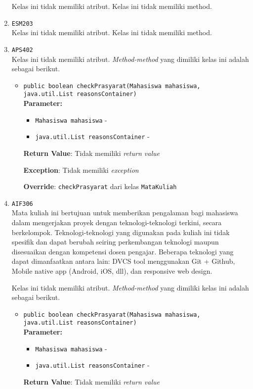 \documentclass{article}
\begin{document}
\begin{enumerate}
Kelas ini tidak memiliki atribut. Kelas ini tidak memiliki method. \item \texttt{ESM203}\\ 


Kelas ini tidak memiliki atribut. Kelas ini tidak memiliki method. \item \texttt{APS402}\\ 


Kelas ini tidak memiliki atribut. \textit{Method-method} yang dimiliki kelas ini adalah sebagai berikut.
\begin{itemize}
\item \texttt{public boolean checkPrasyarat(Mahasiswa mahasiswa, java.util.List reasonsContainer)}\\ 


\textbf{Parameter:}\begin{itemize}
\item \texttt{Mahasiswa mahasiswa} - 
\item \texttt{java.util.List reasonsContainer} - 
\end{itemize}
\textbf{Return Value}: Tidak memiliki \textit{return value}

\textbf{Exception}: Tidak memiliki \textit{exception}

\textbf{Override}: \texttt{checkPrasyarat} dari kelas \texttt{MataKuliah}

\end{itemize}
\item \texttt{AIF306}\\ 
Mata kuliah ini bertujuan untuk memberikan pengalaman bagi mahasiswa dalam
 mengerjakan proyek dengan teknologi-teknologi terkini, secara berkelompok.
 Teknologi-teknologi yang digunakan pada kuliah ini tidak spesifik dan dapat
 berubah seiring perkembangan teknologi maupun disesuaikan dengan kompetensi
 dosen pengajar. Beberapa teknologi yang dapat dimanfaatkan antara lain: DVCS
 tool menggunakan Git + Github, Mobile native app (Android, iOS, dll), dan
 responsive web design.

Kelas ini tidak memiliki atribut. \textit{Method-method} yang dimiliki kelas ini adalah sebagai berikut.
\begin{itemize}
\item \texttt{public boolean checkPrasyarat(Mahasiswa mahasiswa, java.util.List reasonsContainer)}\\ 


\textbf{Parameter:}\begin{itemize}
\item \texttt{Mahasiswa mahasiswa} - 
\item \texttt{java.util.List reasonsContainer} - 
\end{itemize}
\textbf{Return Value}: Tidak memiliki \textit{return value}


\end{itemize}
\end{enumerate}
\end{document}
